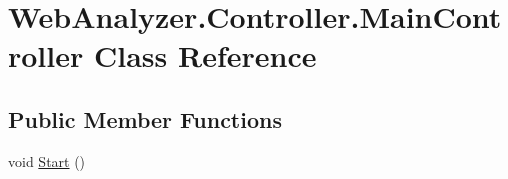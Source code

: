\hypertarget{class_web_analyzer_1_1_controller_1_1_main_controller}{}\section{Web\+Analyzer.\+Controller.\+Main\+Controller Class Reference}
\label{class_web_analyzer_1_1_controller_1_1_main_controller}
\subsection*{Public Member Functions}
\begin{DoxyCompactItemize}
\item 
void \hyperlink{class_web_analyzer_1_1_controller_1_1_main_controller_aa0e998787b138f45bf60f543c774a31f}{Start} ()
\end{DoxyCompactItemize}
